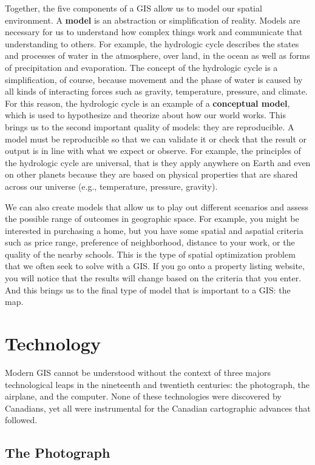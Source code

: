 \documentclass[
]{book}
\begin{document}
Together, the five components of a GIS allow us to model our spatial environment. A \textbf{model} is an abstraction or simplification of reality. Models are necessary for us to understand how complex things work and communicate that understanding to others. For example, the hydrologic cycle describes the states and processes of water in the atmosphere, over land, in the ocean as well as forms of precipitation and evaporation. The concept of the hydrologic cycle is a simplification, of course, because movement and the phase of water is caused by all kinds of interacting forces such as gravity, temperature, pressure, and climate. For this reason, the hydrologic cycle is an example of a \textbf{conceptual model}, which is used to hypothesize and theorize about how our world works. This brings us to the second important quality of models: they are reproducible. A model must be reproducible so that we can validate it or check that the result or output is in line with what we expect or observe. For example, the principles of the hydrologic cycle are universal, that is they apply anywhere on Earth and even on other planets because they are based on physical properties that are shared across our universe (e.g., temperature, pressure, gravity).

We can also create models that allow us to play out different scenarios and assess the possible range of outcomes in geographic space. For example, you might be interested in purchasing a home, but you have some spatial and aspatial criteria such as price range, preference of neighborhood, distance to your work, or the quality of the nearby schools. This is the type of spatial optimization problem that we often seek to solve with a GIS. If you go onto a property listing website, you will notice that the results will change based on the criteria that you enter. And this brings us to the final type of model that is important to a GIS: the map.

\section{Technology}\label{technology}

Modern GIS cannot be understood without the context of three majors technological leaps in the nineteenth and twentieth centuries: the photograph, the airplane, and the computer. None of these technologies were discovered by Canadians, yet all were instrumental for the Canadian cartographic advances that followed.

\subsection{The Photograph}\label{the-photograph}
\end{document}

